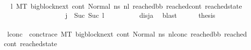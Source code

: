 \begin{isabellebody}
\ \ \ \ \isamarkupfalse%
\ {\isachardoublequoteopen}{\isacharparenleft}{\kern0pt}{\isasymexists}\ l{}{\isachardot}{\kern0pt}\ {\isacharparenleft}{\kern0pt}M{\isacharcomma}{\kern0pt}{\isasymLambda}{\isacharcomma}{\kern0pt}{\isasymGamma}{\isacharcomma}{\kern0pt}{\isasymOmega}{\isacharcomma}{\kern0pt}T\ {\isasymturnstile}{\isacharparenleft}{\kern0pt}bigblock{\isacharunderscore}{\kern0pt}next{\isacharcomma}{\kern0pt}\ cont{}{\isacharcomma}{\kern0pt}\ Normal\ ns{}{\isacharprime}{\kern0pt}{\isacharprime}{\kern0pt}{\isacharparenright}{\kern0pt}\ {\isacharminus}{\kern0pt}n{\isasymlongrightarrow}{\isacharcircum}{\kern0pt}l{}\ {\isacharparenleft}{\kern0pt}reached{\isacharunderscore}{\kern0pt}bb{\isacharcomma}{\kern0pt}\ reached{\isacharunderscore}{\kern0pt}cont{\isacharcomma}{\kern0pt}\ reached{\isacharunderscore}{\kern0pt}state{\isacharparenright}{\kern0pt}{\isacharparenright}{\kern0pt}\ {\isasymand}\ \isanewline
\ \ \ \ \ \ \ \ \ \ \ \ \ \ \ \ \ \ {\isacharparenleft}{\kern0pt}j{\isacharprime}{\kern0pt}\ {\isacharequal}{\kern0pt}\ Suc\ {\isacharparenleft}{\kern0pt}Suc\ l{}{\isacharparenright}{\kern0pt}{\isacharparenright}{\kern0pt}\ {\isacharparenright}{\kern0pt}{\isachardoublequoteclose}\ \isanewline
\ \ \ \ \ \ \isamarkupfalse%
\ disj{\isacharunderscore}{\kern0pt}a\ \isamarkupfalse%
\ blast\isanewline
\ \ \ \ \isamarkupfalse%
\ {\isacharquery}{\kern0pt}thesis\isanewline
\ \ \ \ \isamarkupfalse%
\ {\isacharminus}{\kern0pt}\isanewline
\ \ \ \ \ \ \isamarkupfalse%
\ l{}{\isacharunderscore}{\kern0pt}conc\ \ conc{\isacharunderscore}{\kern0pt}trace{\isacharcolon}{\kern0pt}\ {\isachardoublequoteopen}{\isacharparenleft}{\kern0pt}M{\isacharcomma}{\kern0pt}{\isasymLambda}{\isacharcomma}{\kern0pt}{\isasymGamma}{\isacharcomma}{\kern0pt}{\isasymOmega}{\isacharcomma}{\kern0pt}T\ {\isasymturnstile}{\isacharparenleft}{\kern0pt}bigblock{\isacharunderscore}{\kern0pt}next{\isacharcomma}{\kern0pt}\ cont{}{\isacharcomma}{\kern0pt}\ Normal\ ns{}{\isacharprime}{\kern0pt}{\isacharprime}{\kern0pt}{\isacharparenright}{\kern0pt}\ {\isacharminus}{\kern0pt}n{\isasymlongrightarrow}{\isacharcircum}{\kern0pt}l{}{\isacharunderscore}{\kern0pt}conc\ {\isacharparenleft}{\kern0pt}reached{\isacharunderscore}{\kern0pt}bb{\isacharcomma}{\kern0pt}\ reached{\isacharunderscore}{\kern0pt}cont{\isacharcomma}{\kern0pt}\ reached{\isacharunderscore}{\kern0pt}state{\isacharparenright}{\kern0pt}{\isacharparenright}{\kern0pt}{\isachardoublequoteclose}\ \ \isanewline

\end{isabellebody}
